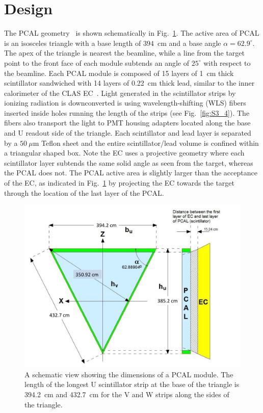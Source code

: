 \section{Design} \label{Design}

The PCAL geometry~\cite{2015002} is shown schematically in Fig.~\ref{fig:S3_1}. The
active area of PCAL is an isosceles triangle with a base length of $394$~cm and a base angle $\alpha=62.9^\circ$.
The apex of the triangle is nearest the beamline, while a line from the target point to the front face of each
module subtends an angle of $25^\circ$ with respect to the beamline. Each PCAL module is composed of 15
layers of 1~cm thick scintillator sandwiched with 14 layers of 0.22~cm thick lead, similar to the inner calorimeter of the CLAS EC~\cite{clas6nim}. Light generated in the scintillator strips by ionizing radiation is downconverted is using wavelength-shifting (WLS) fibers inserted inside holes running the length of the strips (see Fig.~\ref{fig:S3_4}). The fibers also transport the light to PMT housing adapters located along the base and U readout side of the triangle.  Each scintillator and lead layer is separated by a $50~\mu$m Teflon sheet and the entire
scintillator/lead volume is confined within a triangular shaped box. Note the EC uses a projective geometry
where each scintillator layer subtends the same solid angle as seen from the target, whereas the PCAL does
not. The PCAL active area is slightly larger than the acceptance of the EC, as indicated in Fig.~\ref{fig:S3_1} by projecting the EC towards the target through the location of the last layer of the PCAL. 

\begin{figure}[h]
\centering
\includegraphics[width=1.0\columnwidth,keepaspectratio]{img/S3_1.pdf}
\caption[Schematic plot of PCAL]{A schematic view showing the dimensions of a PCAL module. The length
of the longest U scintillator strip at the base of the triangle is 394.2~cm and 432.7~cm for the V
and W strips along the sides of the triangle. }
\label{fig:S3_1}
\end{figure}


